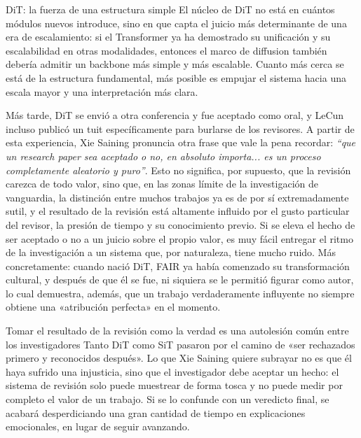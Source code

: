 \documentclass[a4paper,12pt]{article}
\begin{document}
\begin{importantbox}{DiT: la fuerza de una estructura simple}
El núcleo de DiT no está en cuántos módulos nuevos introduce, sino en que capta el juicio más determinante de una era de escalamiento: si el Transformer ya ha demostrado su unificación y su escalabilidad en otras modalidades, entonces el marco de diffusion también debería admitir un backbone más simple y más escalable. Cuanto más cerca se está de la estructura fundamental, más posible es empujar el sistema hacia una escala mayor y una interpretación más clara.
\end{importantbox}

Más tarde, DiT se envió a otra conferencia y fue aceptado como oral, y LeCun incluso publicó un tuit específicamente para burlarse de los revisores. A partir de esta experiencia, Xie Saining pronuncia otra frase que vale la pena recordar: \textit{``que un research paper sea aceptado o no, en absoluto importa... es un proceso completamente aleatorio y puro''}. Esto no significa, por supuesto, que la revisión carezca de todo valor, sino que, en las zonas límite de la investigación de vanguardia, la distinción entre muchos trabajos ya es de por sí extremadamente sutil, y el resultado de la revisión está altamente influido por el gusto particular del revisor, la presión de tiempo y su conocimiento previo. Si se eleva el hecho de ser aceptado o no a un juicio sobre el propio valor, es muy fácil entregar el ritmo de la investigación a un sistema que, por naturaleza, tiene mucho ruido. Más concretamente: cuando nació DiT, FAIR ya había comenzado su transformación cultural, y después de que él se fue, ni siquiera se le permitió figurar como autor, lo cual demuestra, además, que un trabajo verdaderamente influyente no siempre obtiene una «atribución perfecta» en el momento.

\begin{warningbox}{Tomar el resultado de la revisión como la verdad es una autolesión común entre los investigadores}
Tanto DiT como SiT pasaron por el camino de «ser rechazados primero y reconocidos después». Lo que Xie Saining quiere subrayar no es que él haya sufrido una injusticia, sino que el investigador debe aceptar un hecho: el sistema de revisión solo puede muestrear de forma tosca y no puede medir por completo el valor de un trabajo. Si se lo confunde con un veredicto final, se acabará desperdiciando una gran cantidad de tiempo en explicaciones emocionales, en lugar de seguir avanzando.
\end{warningbox}
\end{document}
